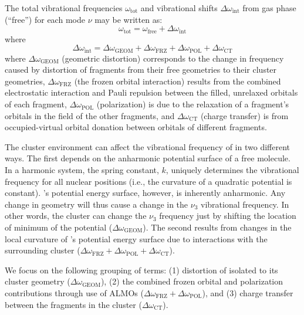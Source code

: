 {The total vibrational frequencies \(\omega_{\mathrm{tot}}\) and vibrational shifts \(\Delta \omega_\mathrm{int}\) from gas phase (``free'')  for each mode \(\nu\) may be written as:
\begin{equation}
  \omega_\mathrm{tot} = \omega_\mathrm{free} + \Delta \omega_\mathrm{int}
\end{equation}
where
\begin{equation}
  \Delta \omega_\mathrm{int} = \Delta \omega_\mathrm{GEOM} + \Delta \omega_\mathrm{FRZ} + \Delta \omega_\mathrm{POL} + \Delta \omega_\mathrm{CT}
\end{equation}
where \(\Delta \omega_\mathrm{GEOM}\) (geometric distortion) corresponds to the change in frequency caused by distortion of fragments from their free geometries to their cluster geometries, \(\Delta \omega_\mathrm{FRZ}\) (the frozen orbital interaction) results from the combined electrostatic interaction and Pauli repulsion between the filled, unrelaxed orbitals of each fragment, \(\Delta \omega_\mathrm{POL}\) (polarization) is due to the relaxation of a fragment's orbitals in the field of the other fragments, and \(\Delta \omega_\mathrm{CT}\) (charge transfer) is from occupied-virtual orbital donation between orbitals of different fragments.\cite{Ramos-Cordoba2011}

The cluster environment can affect the vibrational frequency of  in two different ways. The first depends on the anharmonic potential surface of a free  molecule. In a harmonic system, the spring constant, \(k\), uniquely determines the vibrational frequency for all nuclear positions (i.e., the curvature of a quadratic potential is constant). 's potential energy surface, however, is inherently anharmonic. Any change in geometry will thus cause a change in the \(\nu_3\) vibrational frequency. In other words, the cluster can change the \(\nu_3\) frequency just by shifting the location of minimum of the  potential (\(\Delta \omega_\mathrm{GEOM}\)). The second results from changes in the local curvature of 's potential energy surface due to interactions with the surrounding cluster (\(\Delta \omega_\mathrm{FRZ} + \Delta\omega_\mathrm{POL} + \Delta \omega_\mathrm{CT}\)).

We focus on the following grouping of terms: (1) distortion of isolated  to its cluster geometry (\(\Delta \omega_\mathrm{GEOM}\)), (2) the combined frozen orbital and polarization contributions through use of ALMOs (\(\Delta \omega_\mathrm{FRZ} + \Delta \omega_\mathrm{POL}\)), and (3) charge transfer between the fragments in the cluster (\(\Delta \omega_\mathrm{CT}\)).

}
